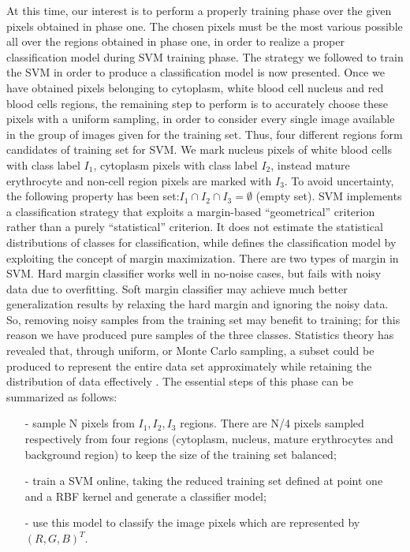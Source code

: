 \documentclass[final,a4paper,12pt,english]{UnicaPhdThesis3}
\begin{document}
	At this time, our interest is to perform a properly training phase over the given pixels obtained in phase one. The chosen pixels must be the most various possible all over the regions obtained in phase one, in order to realize a proper classification model during SVM training phase. 
	The strategy we followed to train the SVM in order to produce a classification model is now presented. Once we have obtained pixels belonging to cytoplasm, white blood cell nucleus and red blood cells regions, the remaining step to perform is to accurately choose these pixels with a uniform sampling, in order to consider every single image available in the group of images given for the training set.
	Thus, four different regions form candidates of training set for SVM. We mark nucleus pixels of white blood cells with class label $I_1$, cytoplasm pixels with class label $I_2$, instead mature erythrocyte and non-cell region pixels are marked with $I_3$. To avoid uncertainty, the following property has been set:$ I_1\cap I_2 \cap I_3 = \emptyset$ (empty set). SVM implements a classification strategy that exploits a margin-based “geometrical” criterion rather than a purely “statistical” criterion. It does not estimate the statistical distributions of classes for classification, while defines the classification model by exploiting the concept of margin maximization. There are two types of margin in SVM. Hard margin classifier works well in no-noise cases, but fails with noisy data due to overfitting. Soft margin classifier may achieve much better generalization results by relaxing the hard margin and ignoring the noisy data. So, removing noisy samples from the training set may benefit to training; for this reason we have produced pure samples of the three classes. Statistics theory has revealed that, through uniform, or Monte Carlo sampling, a subset could be produced to represent the entire data set approximately while retaining the distribution of data effectively \cite{caflisch}.
	The essential steps of this phase can be summarized as follows:
	\begin{itemize}\itemsep3pt \parskip0pt 
		\item[-] sample N pixels from $ I_1, I_2, I_3$ regions. There are N/4 pixels sampled respectively from four regions (cytoplasm, nucleus, mature erythrocytes and background region) to keep the size of the training set balanced;
		\item[-] train a SVM online, taking the reduced training set defined at point one and a RBF kernel and generate a classifier model;
		\item[-] use this model to classify the image pixels which are represented by $(R,G,B)^T.$
	\end{itemize}	
\end{document}
